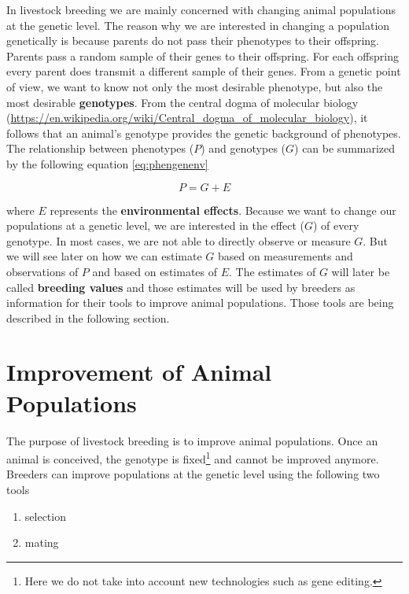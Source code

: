 \documentclass[
]{book}
\providecommand{\tightlist}{%
  \setlength{\itemsep}{0pt}\setlength{\parskip}{0pt}}
\begin{document}
In livestock breeding we are mainly concerned with changing animal populations at the genetic level. The reason why we are interested in changing a population genetically is because parents do not pass their phenotypes to their offspring. Parents pass a random sample of their genes to their offspring. For each offspring every parent does transmit a different sample of their genes. From a genetic point of view, we want to know not only the most desirable phenotype, but also the most desirable \textbf{genotypes}. From the central dogma of molecular biology (\url{https://en.wikipedia.org/wiki/Central_dogma_of_molecular_biology}), it follows that an animal's genotype provides the genetic background of phenotypes. The relationship between phenotypes (\(P\)) and genotypes (\(G\)) can be summarized by the following equation \eqref{eq:phengenenv}

\begin{equation}
P = G + E
\label{eq:phengenenv}
\end{equation}

where \(E\) represents the \textbf{environmental effects}. Because we want to change our populations at a genetic level, we are interested in the effect (\(G\)) of every genotype. In most cases, we are not able to directly observe or measure \(G\). But we will see later on how we can estimate \(G\) based on measurements and observations of \(P\) and based on estimates of \(E\). The estimates of \(G\) will later be called \textbf{breeding values} and those estimates will be used by breeders as information for their tools to improve animal populations. Those tools are being described in the following section.

\hypertarget{improvementanimalpopulations}{%
\section{Improvement of Animal Populations}\label{improvementanimalpopulations}}

The purpose of livestock breeding is to improve animal populations. Once an animal is conceived, the genotype is fixed\footnote{Here we do not take into account new technologies such as gene editing.} and cannot be improved anymore. Breeders can improve populations at the genetic level using the following two tools

\begin{enumerate}
\def\labelenumi{\arabic{enumi}.}
\tightlist
\item
  selection
\item
  mating
\end{enumerate}
\end{document}
